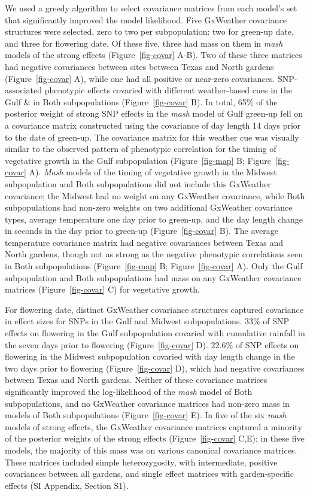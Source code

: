 \documentclass[
  9pt,
  twocolumn,
  twoside]{pnas-new}
\begin{document}
We used a greedy algorithm to select covariance matrices from each
model's set that significantly improved the model likelihood. Five
GxWeather covariance structures were selected, zero to two per
subpopulation: two for green-up date, and three for flowering date. Of
these five, three had mass on them in \emph{mash} models of the strong
effects (Figure~\ref{fig-covar} A-B). Two of these three matrices had
negative covariances between sites between Texas and North gardens
(Figure~\ref{fig-covar} A), while one had all positive or near-zero
covariances. SNP-associated phenotypic effects covaried with different
weather-based cues in the Gulf \& in Both subpopulations
(Figure~\ref{fig-covar} B). In total, 65\% of the posterior weight of
strong SNP effects in the \emph{mash} model of Gulf green-up fell on a
covariance matrix constructed using the covariance of day length 14 days
prior to the date of green-up. The covariance matrix for this weather
cue was visually similar to the observed pattern of phenotypic
correlation for the timing of vegetative growth in the Gulf
subpopulation (Figure~\ref{fig-map} B; Figure~\ref{fig-covar} A).
\emph{Mash} models of the timing of vegetative growth in the Midwest
subpopulation and Both subpopulations did not include this GxWeather
covariance; the Midwest had no weight on any GxWeather covariance, while
Both subpopulations had non-zero weights on two additional GxWeather
covariance types, average temperature one day prior to green-up, and the
day length change in seconds in the day prior to green-up
(Figure~\ref{fig-covar} B). The average temperature covariance matrix
had negative covariances between Texas and North gardens, though not as
strong as the negative phenotypic correlations seen in Both
subpopulations (Figure~\ref{fig-map} B; Figure~\ref{fig-covar} A). Only
the Gulf subpopulation and Both subpopulations had mass on any GxWeather
covariance matrices (Figure~\ref{fig-covar} C) for vegetative growth.

For flowering date, distinct GxWeather covariance structures captured
covariance in effect sizes for SNPs in the Gulf and Midwest
subpopulations. 33\% of SNP effects on flowering in the Gulf
subpopulation covaried with cumulative rainfall in the seven days prior
to flowering (Figure~\ref{fig-covar} D). 22.6\% of SNP effects on
flowering in the Midwest subpopulation covaried with day length change
in the two days prior to flowering (Figure~\ref{fig-covar} D), which had
negative covariances between Texas and North gardens. Neither of these
covariance matrices significantly improved the log-likelihood of the
\emph{mash} model of Both subpopulations, and no GxWeather covariance
matrices had non-zero mass in models of Both subpopulations
(Figure~\ref{fig-covar} E). In five of the six \emph{mash} models of
strong effects, the GxWeather covariance matrices captured a minority of
the posterior weights of the strong effects (Figure~\ref{fig-covar}
C,E); in these five models, the majority of this mass was on various
canonical covariance matrices. These matrices included simple
heterozygosity, with intermediate, positive covariances between all
gardens, and single effect matrices with garden-specific effects (SI
Appendix, Section S1).
\end{document}

